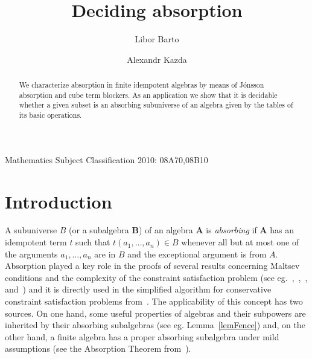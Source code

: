 \documentclass{amsart}
\theoremstyle{plain}
\theoremstyle{definition}
\begin{document}
\title{Deciding absorption}
\author{Libor Barto}
\address{Department of Algebra, Charles University\\
Sokolovsk\'a 83, 186 00 Praha 8, Czech Republic}
\author{Alexandr Kazda}
\address{Institute of Science and Technology Austria\\
Am Campus 1, 3400, Klosterneuburg, Austria}
\maketitle

\begin{abstract}
We characterize absorption in finite idempotent algebras by means of J\'onsson absorption and cube term blockers. As an application we show that it is decidable whether a given subset is an absorbing subuniverse of an algebra given by the tables of its basic operations. 
\end{abstract}


Mathematics Subject Classification 2010: 08A70,08B10
\section{Introduction}

A subuniverse $B$ (or a subalgebra ${\mathbf{{B}}}$) of an algebra ${{\mathbf{A}}}$ is \emph{absorbing} if ${{\mathbf{A}}}$ has an idempotent term $t$ such that $t(a_1, \dots, a_n) \in B$ whenever all but at most one of the arguments $a_1, \dots, a_n$ are in $B$ and the exceptional argument is from $A$. 
Absorption played a key role in the proofs of several results concerning
Maltsev conditions and the complexity of the constraint satisfaction problem
(see eg.~\cite{barto-kozik-cyclic-terms-and-csp},~\cite{barto-kozik-stanovsky-absorption-solvability},~\cite{barto-kozik-bw-2014},
and~\cite{barto-kozik-approximation}) and it is directly used in the simplified algorithm for conservative constraint satisfaction problems from~\cite{libor-conservative}.
The applicability of this concept has two sources.
On one hand, some useful properties of algebras and their subpowers are inherited by their absorbing subalgebras (see eg. Lemma~\ref{lemFence}) and, on the other hand, a finite algebra has a proper absorbing subalgebra under mild assumptions (see the Absorption Theorem from~\cite{barto-kozik-cyclic-terms-and-csp}).  
\end{document}
